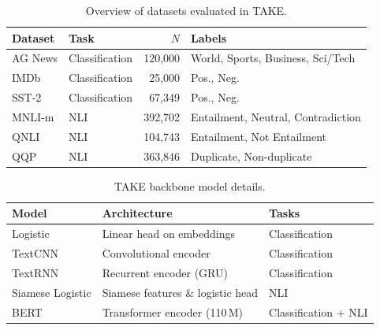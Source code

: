 \documentclass[12pt, a4paper, twoside]{book}
\numberwithin{equation}{chapter}
\theoremstyle{plain}
\theoremstyle{definition}
\theoremstyle{remark}
\begin{document}
\begin{table}[ht]
  \centering
  \begin{threeparttable}
    \caption{Overview of datasets evaluated in TAKE.}
    \label{tab:54-research03-experiments-datasets}
    \begin{tabular}{l l r l}
      \toprule
      \textbf{Dataset} & \textbf{Task} & $N$ & \textbf{Labels} \\
      \midrule
      AG News   & Classification & 120,000 & World, Sports, Business, Sci/Tech \\
      IMDb      & Classification &  25,000 & Pos., Neg. \\
      SST-2     & Classification &  67,349 & Pos., Neg. \\
      MNLI-m    & NLI            & 392,702 & Entailment, Neutral, Contradiction \\
      QNLI      & NLI            & 104,743 & Entailment, Not Entailment \\
      QQP       & NLI            & 363,846 & Duplicate, Non-duplicate \\
      \bottomrule
    \end{tabular}
  \end{threeparttable}
\end{table}

\begin{table}[ht]
  \centering
  \begin{threeparttable}
    \caption{TAKE backbone model details.}
    \label{tab:54-research03-experiments-backbones}
    \begin{tabular}{l l l}
      \toprule
      \textbf{Model}        & \textbf{Architecture}             & \textbf{Tasks} \\
      \midrule
      Logistic              & Linear head on embeddings         & Classification \\
      TextCNN               & Convolutional encoder             & Classification \\
      TextRNN               & Recurrent encoder (GRU)           & Classification \\
      Siamese Logistic      & Siamese features \& logistic head & NLI \\
      BERT                  & Transformer encoder (110\,M)      & Classification + NLI \\
      \bottomrule
    \end{tabular}
  \end{threeparttable}
\end{table}
\end{document}
